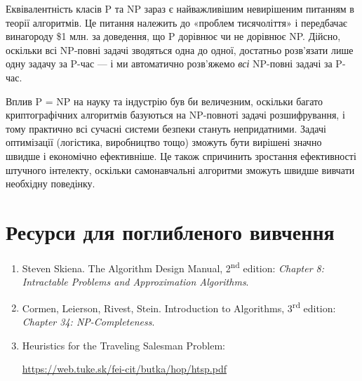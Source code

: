 \documentclass[12pt,a4paper]{report}
\begin{document}
Еквівалентність класів P та NP зараз є найважливішим невирішеним питанням в теорії алгоритмів. Це питання належить до «проблем тисячоліття» і передбачає винагороду \$1 млн. за доведення, що P дорівнює чи не дорівнює NP. Дійсно, оскільки всі NP-повні задачі зводяться одна до одної, достатньо розв’язати лише одну задачу за P-час --- і ми автоматично розв’яжемо \emph{всі} NP-повні задачі за P-час.

Вплив P = NP на науку та індустрію був би величезним, оскільки багато криптографічних алгоритмів базуються на NP-повноті задачі розшифрування, і тому практично всі сучасні системи безпеки стануть непридатними. Задачі оптимізації (логістика, виробництво тощо) зможуть бути вирішені значно швидше і економічно ефективніше. Це також спричинить зростання ефективності штучного інтелекту, оскільки самонавчальні алгоритми зможуть швидше вивчати необхідну поведінку.



\section*{Ресурси для поглибленого вивчення}
\begin{enumerate}
    \item Steven Skiena. The Algorithm Design Manual, 2\textsuperscript{nd} edition: {\itshape Chapter 8: Intractable Problems and Approximation Algorithms}.
    \item Cormen, Leierson, Rivest, Stein. Introduction to Algorithms, 3\textsuperscript{rd} edition: {\itshape Chapter 34: NP-Completeness}.
    \item Heuristics for the Traveling Salesman Problem:

          \href{https://web.tuke.sk/fei-cit/butka/hop/htsp.pdf}{https://web.tuke.sk/fei-cit/butka/hop/htsp.pdf}\end{enumerate}
\end{document}
